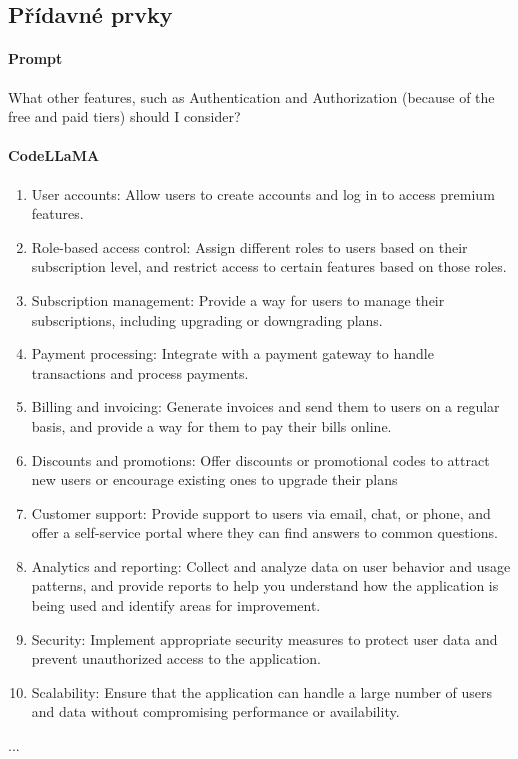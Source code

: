 \documentclass[FM,DP]{tulthesis}
\begin{document}
		\subsection{Přídavné prvky}
		\begin{tcolorbox}[colback=white,colframe=black]
			\paragraph{Prompt} 
			What other features, such as Authentication and Authorization (because of the free and paid tiers) should I consider?
			
			
			\vspace{0.6em}
			
			\paragraph{CodeLLaMA} 
			\begin{enumerate}
				\item User accounts: Allow users to create accounts and log in to access premium features.
				\item Role-based access control: Assign different roles to users based on their subscription level, and restrict access to certain features based on those roles.
				\item Subscription management: Provide a way for users to manage their subscriptions, including upgrading or downgrading plans.
				\item Payment processing: Integrate with a payment gateway to handle transactions and process payments.
				\item Billing and invoicing: Generate invoices and send them to users on a regular basis, and provide a way for them to pay their bills online.
				\item Discounts and promotions: Offer discounts or promotional codes to attract new users or encourage existing ones to upgrade their plans \cite{codellama_analyza}
				\item Customer support: Provide support to users via email, chat, or phone, and offer a self-service portal where they can find answers to common questions.
				\item Analytics and reporting: Collect and analyze data on user behavior and usage patterns, and provide reports to help you understand how the application is being used and identify areas for improvement.
				\item Security: Implement appropriate security measures to protect user data and prevent unauthorized access to the application.
				\item Scalability: Ensure that the application can handle a large number of users and data without compromising performance or availability. 
			\end{enumerate}
			... \cite{codellama_analyza}
		\end{tcolorbox}
		\vspace{0.6em}
		
\end{document}
